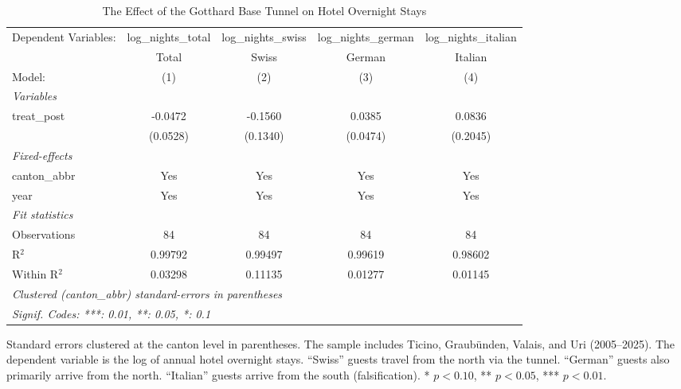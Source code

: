 
\begin{table}[htbp]
   \caption{\label{tab:tourism} The Effect of the Gotthard Base Tunnel on Hotel Overnight Stays}
   \centering
   \footnotesize
   \begin{tabular}{lcccc}
      \tabularnewline \midrule \midrule
      Dependent Variables: & log\_nights\_total   & log\_nights\_swiss   & log\_nights\_german   & log\_nights\_italian\\    
                           & Total                & Swiss                & German                & Italian \\   
      Model:               & (1)                  & (2)                  & (3)                   & (4)\\  
      \midrule
      \emph{Variables}\\
      treat\_post          & -0.0472              & -0.1560              & 0.0385                & 0.0836\\   
                           & (0.0528)             & (0.1340)             & (0.0474)              & (0.2045)\\   
      \midrule
      \emph{Fixed-effects}\\
      canton\_abbr         & Yes                  & Yes                  & Yes                   & Yes\\  
      year                 & Yes                  & Yes                  & Yes                   & Yes\\  
      \midrule
      \emph{Fit statistics}\\
      Observations         & 84                   & 84                   & 84                    & 84\\  
      R$^2$                & 0.99792              & 0.99497              & 0.99619               & 0.98602\\  
      Within R$^2$         & 0.03298              & 0.11135              & 0.01277               & 0.01145\\  
      \midrule \midrule
      \multicolumn{5}{l}{\emph{Clustered (canton\_abbr) standard-errors in parentheses}}\\
      \multicolumn{5}{l}{\emph{Signif. Codes: ***: 0.01, **: 0.05, *: 0.1}}\\
   \end{tabular}
   
   \par \raggedright 
   Standard errors clustered at the canton level in parentheses. The sample includes Ticino, Graub\"unden, Valais, and Uri (2005--2025). The dependent variable is the log of annual hotel overnight stays. ``Swiss'' guests travel from the north via the tunnel. ``German'' guests also primarily arrive from the north. ``Italian'' guests arrive from the south (falsification). * $p<0.10$, ** $p<0.05$, *** $p<0.01$.
\end{table}


